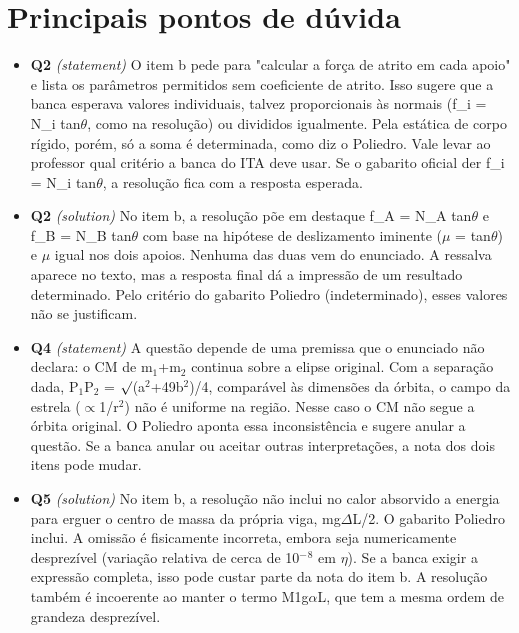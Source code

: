 \documentclass{article}%
\begin{document}
\section*{Principais pontos de dúvida}%
\begin{itemize}%
\item%
\textbf{Q2} \textit{(statement)} O item b pede para "calcular a força de atrito em cada apoio" e lista os parâmetros permitidos sem coeficiente de atrito. Isso sugere que a banca esperava valores individuais, talvez proporcionais às normais (f\_i = N\_i tan$\theta$, como na resolução) ou divididos igualmente. Pela estática de corpo rígido, porém, só a soma é determinada, como diz o Poliedro. Vale levar ao professor qual critério a banca do ITA deve usar. Se o gabarito oficial der f\_i = N\_i tan$\theta$, a resolução fica com a resposta esperada.%
\item%
\textbf{Q2} \textit{(solution)} No item b, a resolução põe em destaque f\_A = N\_A tan$\theta$ e f\_B = N\_B tan$\theta$ com base na hipótese de deslizamento iminente ($\mu$ = tan$\theta$) e $\mu$ igual nos dois apoios. Nenhuma das duas vem do enunciado. A ressalva aparece no texto, mas a resposta final dá a impressão de um resultado determinado. Pelo critério do gabarito Poliedro (indeterminado), esses valores não se justificam.%
\item%
\textbf{Q4} \textit{(statement)} A questão depende de uma premissa que o enunciado não declara: o CM de m$_{1}$+m$_{2}$ continua sobre a elipse original. Com a separação dada, P$_{1}$P$_{2}$ = $\surd$(a$^2$+49b$^2$)/4, comparável às dimensões da órbita, o campo da estrela ($\propto$1/r$^2$) não é uniforme na região. Nesse caso o CM não segue a órbita original. O Poliedro aponta essa inconsistência e sugere anular a questão. Se a banca anular ou aceitar outras interpretações, a nota dos dois itens pode mudar.%
\item%
\textbf{Q5} \textit{(solution)} No item b, a resolução não inclui no calor absorvido a energia para erguer o centro de massa da própria viga, mg$\Delta$L/2. O gabarito Poliedro inclui. A omissão é fisicamente incorreta, embora seja numericamente desprezível (variação relativa de cerca de 10$^{-}$$^{8}$ em $\eta$). Se a banca exigir a expressão completa, isso pode custar parte da nota do item b. A resolução também é incoerente ao manter o termo M1g$\alpha$L, que tem a mesma ordem de grandeza desprezível.%
\end{itemize}%
\end{document}
